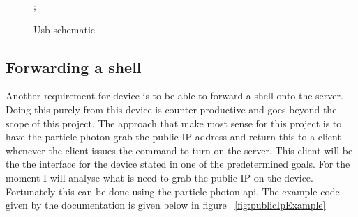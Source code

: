 \documentclass{article}
\begin{document}
\begin{figure}[H]
    \noindent{};
    \caption{Usb schematic} \label{fig:usbSch}
\end{figure}

\subsection{Forwarding a shell}
Another requirement for device is to be able to forward a shell onto the server. Doing this
purely from this device is counter productive and goes beyond the scope of this project. The
approach that make most sense for this project is to have the particle photon grab the public
IP address and return this to a client whenever the client issues the command to turn on the
server. This client will be the the interface for the device stated in one of the predetermined
goals. For the moment I will analyse what is need to grab the public IP on the device. Fortunately
this can be done using the particle photon api\cite{publicIPDocs}. The example code given by the
documentation is given below in figure
~\ref{fig:publicIpExample}
\end{document}
